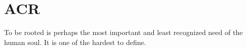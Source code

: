 \documentclass[../thesis.tex]{subfiles}
\begin{document}
\chapter{ACR}
\label{ch:acr}

\epigraph{
  To be rooted is perhaps the most important and least recognized need of the
  human soul. It is one of the hardest to define.
}{
}
\end{document}
